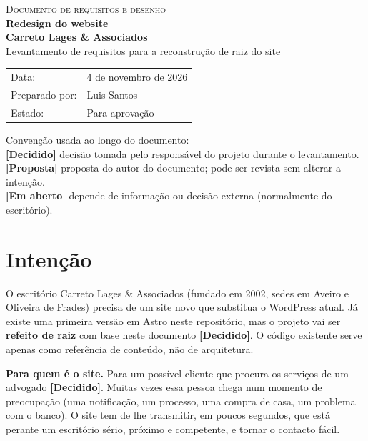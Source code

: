 \documentclass[11pt,a4paper]{article}
\newcommand{\decidido}{\textcolor{verde700}{\textbf{[Decidido]}}}
\newcommand{\proposta}{\textcolor{bronze}{\textbf{[Proposta]}}}
\newcommand{\aberto}{\textcolor{red!60!black}{\textbf{[Em aberto]}}}
\begin{document}
\begin{titlepage}
  \vspace*{3cm}
  {\color{bronze}\small\scshape Documento de requisitos e desenho}\\[0.6em]
  {\Huge\bfseries\color{verde700} Redesign do website\\[0.2em] Carreto Lages \& Associados}\\[1.2em]
  {\large Levantamento de requisitos para a reconstrução de raiz do site}\\[3em]
  \begin{tabular}{@{}ll}
    Data: & 4 de novembro de 2026 \\
    Preparado por: & Luis Santos \\
    Estado: & Para aprovação \\
  \end{tabular}
  \vfill
  {\small\color{tintasuave}
  Convenção usada ao longo do documento:\\
  \decidido{} decisão tomada pelo responsável do projeto durante o levantamento.\\
  \proposta{} proposta do autor do documento; pode ser revista sem alterar a intenção.\\
  \aberto{} depende de informação ou decisão externa (normalmente do escritório).}
\end{titlepage}

\tableofcontents
\newpage

\section{Intenção}

O escritório Carreto Lages \& Associados (fundado em 2002, sedes em Aveiro e Oliveira de Frades) precisa de um site novo que substitua o WordPress atual. Já existe uma primeira versão em Astro neste repositório, mas o projeto vai ser \textbf{refeito de raiz} com base neste documento \decidido. O código existente serve apenas como referência de conteúdo, não de arquitetura.

\textbf{Para quem é o site.} Para um possível cliente que procura os serviços de um advogado \decidido. Muitas vezes essa pessoa chega num momento de preocupação (uma notificação, um processo, uma compra de casa, um problema com o banco). O site tem de lhe transmitir, em poucos segundos, que está perante um escritório sério, próximo e competente, e tornar o contacto fácil.
\end{document}
